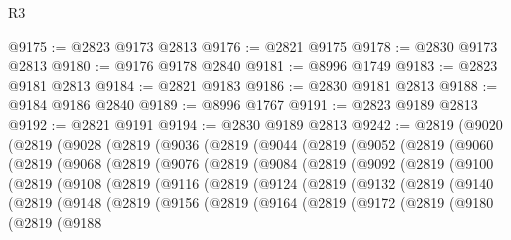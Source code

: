 \begin{lexlean}{R3}
\begin{coremodule}
@9175 := @2823 @9173 @2813
@9176 := @2821 @9175
@9178 := @2830 @9173 @2813
@9180 := @9176 @9178 @2840
@9181 := @8996 @1749
@9183 := @2823 @9181 @2813
@9184 := @2821 @9183
@9186 := @2830 @9181 @2813
@9188 := @9184 @9186 @2840
@9189 := @8996 @1767
@9191 := @2823 @9189 @2813
@9192 := @2821 @9191
@9194 := @2830 @9189 @2813
@9242 := @2819
    (@9020
      (@2819
        (@9028
          (@2819
            (@9036
              (@2819
                (@9044
                  (@2819
                    (@9052
                      (@2819
                        (@9060
                          (@2819
                            (@9068
                              (@2819
                                (@9076
                                  (@2819
                                    (@9084
                                      (@2819
                                        (@9092
                                          (@2819
                                            (@9100
                                              (@2819
                                                (@9108
                                                  (@2819
                                                    (@9116
                                                      (@2819
                                                        (@9124
                                                          (@2819
                                                            (@9132
                                                              (@2819
                                                                (@9140
                                                                  (@2819
                                                                    (@9148
                                                                      (@2819
                                                                        (@9156
                                                                          (@2819
                                                                            (@9164
                                                                              (@2819
                                                                                (@9172
                                                                                  (@2819
                                                                                    (@9180
                                                                                      (@2819
                                                                                        (@9188

\end{coremodule}
\end{lexlean}
